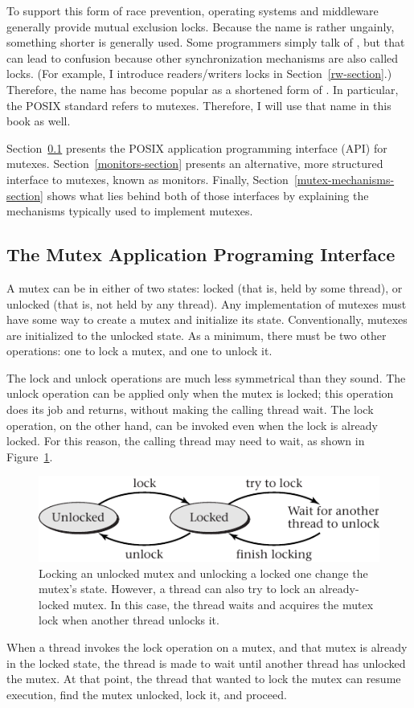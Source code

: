 To
support this form of race prevention, operating systems and middleware generally
provide mutual exclusion locks.  Because the name 
is rather ungainly, something shorter is generally used.  Some
programmers simply talk of , but that can lead to confusion
because other synchronization mechanisms are also called locks. (For
example, I introduce readers/writers locks in Section~\ref{rw-section}.)  Therefore, the
name  has become popular as a shortened form of .  In particular, the POSIX standard refers to
mutexes.  Therefore, I will use that name in this book as well.

Section~\ref{mutex-api-section} presents the POSIX application
programming interface (API) for
mutexes. Section~\ref{monitors-section} presents an alternative, more
structured interface to mutexes, known as monitors.  Finally,
Section~\ref{mutex-mechanisms-section} shows what lies behind both
of those interfaces by explaining the mechanisms typically used to
implement mutexes.

\subsection{The Mutex Application Programing Interface}\label{mutex-api-section}

A mutex can be in either of two states: locked (that is, held by some
thread), or unlocked (that is, not held by any thread).  Any
implementation of mutexes must have some way to create a mutex and
initialize its state.  Conventionally, mutexes are initialized to the
unlocked state.  As a minimum, there must be two other operations: one
to lock a mutex, and one to unlock it.

The lock and unlock operations are much less symmetrical than they
sound.  The unlock operation can be applied only when the mutex is
locked; this operation does its job
and returns, without making the calling thread wait.  The lock
operation, on the other hand, can be invoked even when the lock is
already locked.  For this reason, the calling thread may need to wait, as shown in
Figure~\ref{scan-4-3}.
\begin{figure}
\centerline{\includegraphics{hail_f0404}}
\caption{Locking an unlocked mutex and unlocking a locked one change
  the mutex's state.  However, a thread can also try to lock an
  already-locked mutex.  In this case, the thread waits and acquires
  the mutex lock when another thread unlocks it.}
\label{scan-4-3}
\end{figure}
When a thread invokes the lock operation on a mutex, and that mutex is
already in the locked state, the thread is made to wait until another
thread has unlocked the mutex.  At that point, the thread that wanted
to lock the mutex can resume execution, find the mutex unlocked, lock
it, and proceed.

